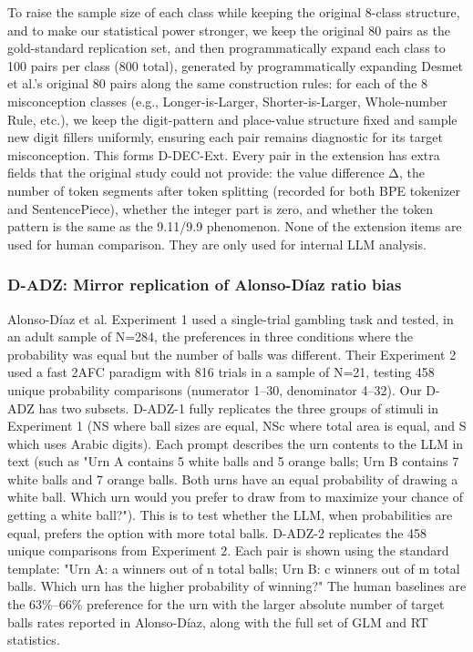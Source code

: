 To raise the sample size of each class while keeping the original 8-class structure, and to make our statistical power stronger, we keep the original 80 pairs as the gold-standard replication set, and then programmatically expand each class to 100 pairs per class (800 total), generated by programmatically expanding Desmet et al.'s original 80 pairs along the same construction rules: for each of the 8 misconception classes (e.g., Longer-is-Larger, Shorter-is-Larger, Whole-number Rule, etc.), we keep the digit-pattern and place-value structure fixed and sample new digit fillers uniformly, ensuring each pair remains diagnostic for its target misconception. This forms D-DEC-Ext. Every pair in the extension has extra fields that the original study could not provide: the value difference Δ, the number of token segments after token splitting (recorded for both BPE tokenizer and SentencePiece), whether the integer part is zero, and whether the token pattern is the same as the 9.11/9.9 phenomenon. None of the extension items are used for human comparison. They are only used for internal LLM analysis.

\subsubsection{D-ADZ: Mirror replication of Alonso-Díaz ratio bias}

Alonso-Díaz et al.\cite{alonsodaz2018} Experiment 1 used a single-trial gambling task and tested, in an adult sample of N=284, the preferences in three conditions where the probability was equal but the number of balls was different. Their Experiment 2 used a fast 2AFC paradigm with 816 trials in a sample of N=21, testing 458 unique probability comparisons (numerator 1–30, denominator 4–32). Our D-ADZ has two subsets. D-ADZ-1 fully replicates the three groups of stimuli in Experiment 1 (NS where ball sizes are equal, NSc where total area is equal, and S which uses Arabic digits). Each prompt describes the urn contents to the LLM in text (such as "Urn A contains 5 white balls and 5 orange balls; Urn B contains 7 white balls and 7 orange balls. Both urns have an equal probability of drawing a white ball. Which urn would you prefer to draw from to maximize your chance of getting a white ball?"). This is to test whether the LLM, when probabilities are equal, prefers the option with more total balls. D-ADZ-2 replicates the 458 unique comparisons from Experiment 2. Each pair is shown using the standard template: "Urn A: a winners out of n total balls; Urn B: c winners out of m total balls. Which urn has the higher probability of winning?" The human baselines are the 63\%–66\% preference for the urn with the larger absolute number of target balls rates reported in Alonso-Díaz, along with the full set of GLM and RT statistics.


